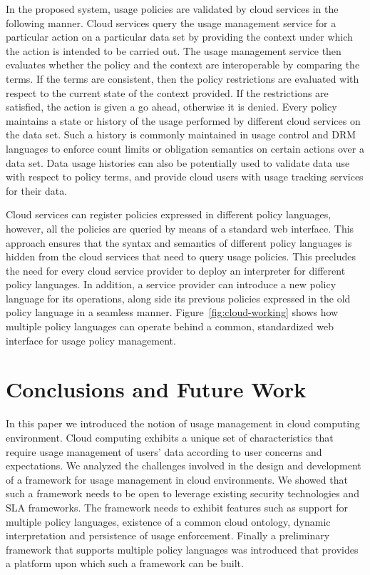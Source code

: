 \documentclass[10pt, conference, compsocconf]{IEEEtran}
\begin{document}
In the proposed system, usage policies are validated by cloud services in the following manner. Cloud services query the usage management service for a particular action on a particular data set by providing the context under which the action is intended to be carried out. The usage management service then evaluates whether the policy and the context are interoperable by comparing the terms. If the terms are consistent, then the policy restrictions are evaluated with respect to the current state of the context provided. If the restrictions are satisfied, the action is given a go ahead, otherwise it is denied. Every policy maintains a state or history of the usage performed by different cloud services on the data set. Such a history is commonly maintained in usage control and DRM languages to enforce count limits or obligation semantics on certain actions over a data set. Data usage histories can also be potentially used to validate data use with respect to policy terms, and provide cloud users with usage tracking services for their data.

Cloud services can register policies expressed in different policy languages,  however, all the policies are queried by means of a standard web interface. This approach ensures that the syntax and semantics of different policy languages is hidden from the cloud services that need to query usage policies. This precludes the need for every cloud service provider to deploy an interpreter for different policy languages. In addition, a service provider can introduce a new policy language for its operations, along side its previous policies expressed in the old policy language in a seamless manner. Figure~\ref{fig:cloud-working} shows how multiple policy languages can operate behind a common, standardized web interface for usage policy management.

\section{Conclusions and Future Work}\label{sec:conclusions}
In this paper we introduced the notion of usage management in cloud computing environment. Cloud computing exhibits a unique set of characteristics that require usage management of users' data according to user concerns and expectations. We analyzed the challenges involved in the design and development of a framework for usage management in cloud environments. We showed that such a framework needs to be open to leverage existing security technologies and SLA frameworks. The framework needs to exhibit features such as support for multiple policy languages, existence of a common cloud ontology, dynamic interpretation and persistence of usage enforcement. Finally a preliminary framework that supports multiple policy languages was introduced that provides a platform upon which such a framework can be built. 
\end{document}
